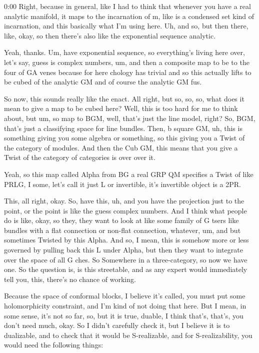 \begin{unfinished}{0:00}
Right, because in general, like I had to think that whenever you have a real analytic manifold, it maps to the incarnation of m, like is a condensed set kind of incarnation, and this basically what I'm using here. Uh, and so, but then there, like, okay, so then there's also like the exponential sequence analytic.

Yeah, thanks. Um, have exponential sequence, so everything's living here over, let's say, guess is complex numbers, um, and then a composite map to be to the four of GA venes because for here chology has trivial and so this actually lifts to be cubed of the analytic GM and of course the analytic GM fus.

So now, this sounds really like the enact. All right, but so, so, so, what does it mean to give a map to be cubed here? Well, this is too hard for me to think about, but um, so map to BGM, well, that's just the line model, right? So, BGM, that's just a classifying space for line bundles. Then, b square GM, uh, this is something giving you some algebra or something, so this giving you a Twist of the category of modules. And then the Cub GM, this means that you give a Twist of the category of categories is over over it.

Yeah, so this map called Alpha from BG a real GRP QM specifies a Twist of like PRLG, I some, let's call it just L or invertible, it's invertible object is a 2PR.

This, all right, okay. So, have this, uh, and you have the projection just to the point, or the point is like the guess complex numbers. And I think what people do is like, okay, so they, they want to look at like some family of G tsers like bundles with a flat connection or non-flat connection, whatever, um, and but sometimes Twisted by this Alpha. And so, I mean, this is somehow more or less governed by pulling back this L under Alpha, but then they want to integrate over the space of all G ches. So
Somewhere in a three-category, so now we have one. So the question is, is this streetable, and as any expert would immediately tell you, this, there's no chance of working.

Because the space of conformal blocks, I believe it's called, you must put some holomorphicity constraint, and I'm kind of not doing that here. But I mean, in some sense, it's not so far, so, but it is true, duable, I think that's, that's, you don't need much, okay. So I didn't carefully check it, but I believe it is to dualizable, and to check that it would be S-realizable, and for S-realizability, you would need the following things:


\end{unfinished}
